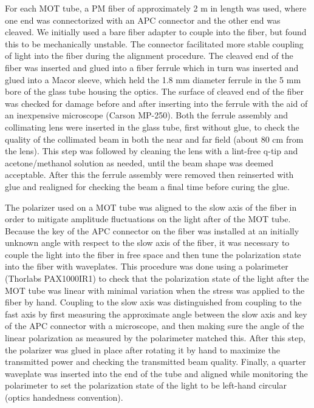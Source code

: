 For each MOT tube, a PM fiber of approximately 2 m in length was used, where one end was connectorized with an APC connector and the other end was cleaved. We initially used a bare fiber adapter to couple into the fiber, but found this to be mechanically unstable. The connector facilitated more stable coupling of light into the fiber during the alignment procedure. The cleaved end of the fiber was inserted and glued into a fiber ferrule which in turn was inserted and glued into a Macor sleeve, which held the 1.8 mm diameter ferrule in the 5 mm bore of the glass tube housing the optics. The surface of cleaved end of the fiber was checked for damage before and after inserting into the ferrule with the aid of an inexpensive microscope (Carson MP-250). Both the ferrule assembly and collimating lens were inserted in the glass tube, first without glue, to check the quality of the collimated beam in both the near and far field (about 80 cm from the lens). This step was followed by cleaning the lens with a lint-free q-tip and acetone/methanol solution as needed, until the beam shape was deemed acceptable. After this the ferrule assembly were removed then reinserted with glue and realigned for checking the beam a final time before curing the glue. 

The polarizer used on a MOT tube was aligned to the slow axis of the fiber in order to mitigate amplitude fluctuations on the light after of the MOT tube. Because the key of the APC connector on the fiber was installed at an initially unknown angle with respect to the slow axis of the fiber, it was necessary to couple the light into the fiber in free space and then tune the polarization state into the fiber with waveplates. This procedure was done using a polarimeter (Thorlabs PAX1000IR1) to check that the polarization state of the light after the MOT tube was linear with minimal variation when the stress was applied to the fiber by hand. Coupling to the slow axis was distinguished from coupling to the fast axis by first measuring the approximate angle between the slow axis and key of the APC connector with a microscope, and then making sure the angle of the linear polarization as measured by the polarimeter matched this. After this step, the polarizer was glued in place after rotating it by hand to maximize the transmitted power and checking the transmitted beam quality. Finally, a quarter waveplate was inserted into the end of the tube and aligned while monitoring the polarimeter to set the polarization state of the light to be left-hand circular (optics handedness convention).


